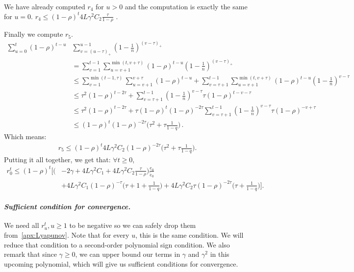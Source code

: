 \documentclass[twoside, 11pt]{article}
\newcommand{\stepsize}{\gamma}
\newcommand{\overlap}{\tau}
\newcommand{\contraction}{\rho}
\newcommand{\lipschitz}{L}
\begin{document}
We have already computed $r_4$ for $u>0$ and the computation is exactly the same for $u=0$. $r_4 \leq (1 - \contraction)^t 4\lipschitz\stepsize^2 C_2 \frac{\overlap}{1-\contraction}$ .

Finally we compute $r_5$.
\begin{align}
\sum_{u=0}^t (1 -\contraction)^{t -u} &\sum_{v=(u -\overlap)_+}^{u -1} (1 -\frac{1}{n})^{(v -\overlap)_+}
\nonumber \\
&=\sum_{v=1}^{t -1} \sum_{u=v +1}^{\min(t, v +\overlap)} (1 -\contraction)^{t -u} (1 -\frac{1}{n})^{(v -\overlap)_+}
\nonumber \\
&\leq \sum_{v=1}^{\min(t-1, \overlap)} \sum_{u=v +1}^{v +\overlap} (1 -\contraction)^{t -u}
	+ \sum_{v=\overlap + 1}^{t -1} \sum_{u=v +1}^{\min(t, v +\overlap)} (1 -\contraction)^{t -u} (1 -\frac{1}{n})^{v -\overlap}
\nonumber \\
&\leq \overlap^2 (1 -\contraction)^{t -2\overlap}
	+ \sum_{v=\overlap +1}^{t -1} (1 -\frac{1}{n})^{v -\overlap} \overlap (1 -\contraction)^{t -v -\overlap}
\nonumber \\
&\leq \overlap^2 (1 -\contraction)^{t -2\overlap}
	+ \overlap (1 -\contraction)^t (1 -\contraction)^{-2\overlap}\sum_{v=\overlap +1}^{t -1} (1 -\frac{1}{n})^{v -\overlap} \overlap (1 -\contraction)^{-v +\overlap}
\nonumber  \\
&\leq (1 -\contraction)^t (1 -\contraction)^{-2\overlap}\big(\overlap^2 + \overlap \frac{1}{1 -q}\big)  \, .
\end{align}
Which means:
\begin{align}
r_5 \leq (1 -\contraction)^t 4\lipschitz\stepsize^2 C_2 (1 -\contraction)^{-2\overlap}\big(\overlap^2 + \overlap \frac{1}{1 -q}\big) .
\end{align}
Putting it all together, we get that: $\forall t \geq 0$,
\begin{equation} \label{r0t}
\begin{aligned}
r_0^t \leq (1 -\contraction)^t
	\Big[
	\Big( &-2 \stepsize +
			4\lipschitz\stepsize^2 C_1+4\lipschitz\stepsize^2 C_2 \frac{\overlap}{1-\contraction} \Big) \frac{e_0}{\tilde e_0} \\
			&+4\lipschitz\stepsize^2 C_1 (1 -\contraction)^{-\overlap} \big(\overlap + 1 + \frac{1}{1 -q} \big)
		+4\lipschitz\stepsize^2 C_2 \overlap (1 -\contraction)^{-2\overlap}\big(\overlap + \frac{1}{1 -q}\big)
	\Big] .
\end{aligned}
\end{equation}

\paragraph{\textit{Sufficient condition for convergence.}}
We need all $r_u^t, u \geq 1$ to be negative so we can safely drop them from~\eqref{apx:Lyapunov}.
Note that for every $u$, this is the same condition.
We will reduce that condition to a second-order polynomial sign condition.
We also remark that since $\stepsize \geq 0$, we can upper bound our terms in $\stepsize$ and $\stepsize^2$ in this upcoming polynomial, which will give us sufficient conditions for convergence.
\end{document}
